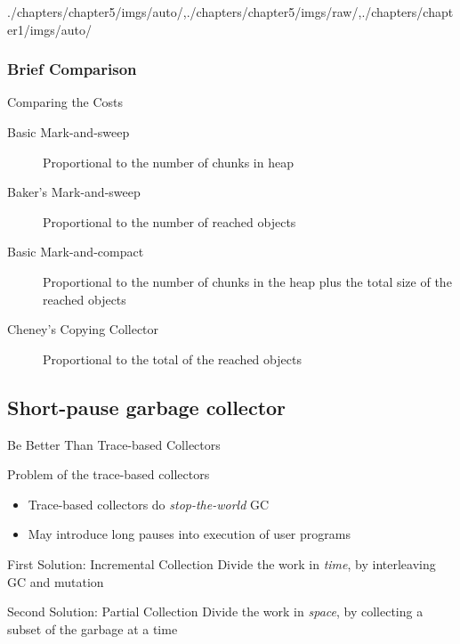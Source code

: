\begin{graphicspathcontext}{{./chapters/chapter5/imgs/auto/},{./chapters/chapter5/imgs/raw/},{./chapters/chapter1/imgs/auto/}}
\begin{bibunit}[apalike]
\subsubsection{Brief Comparison}
\subsubsectiontableofcontentslide

\begin{frame}[background=8]{Comparing the Costs}
	\begin{description}
		\item[Basic Mark-and-sweep] Proportional to the number of chunks in heap
		\vfill
		\item[Baker's Mark-and-sweep] Proportional to the number of reached objects
		\vfill
		\item[Basic Mark-and-compact] Proportional to the number of chunks in the heap plus the total size of the reached objects
		\vfill
		\item[Cheney's Copying Collector] Proportional to the total of the reached objects
	\end{description}
\end{frame}

\subsection{Short-pause garbage collector}
\subsectiontableofcontentslide

\begin{frame}{{Be Better Than} Trace-based Collectors}
	\begin{alertblock}{Problem of the trace-based collectors}
		\begin{itemize}
			\item Trace-based collectors do \emph{stop-the-world} GC
			\item May introduce long pauses into execution of user programs
		\end{itemize}
	\end{alertblock}
	\vspace{.5cm}
	\begin{block}{First Solution: Incremental Collection}
		Divide the work in \emph{time}, by interleaving GC and mutation
	\end{block}
	\vspace{.5cm}
	\begin{block}{Second Solution: Partial Collection}
		Divide the work in \emph{space}, by collecting a subset of the garbage at a time
	\end{block}
\end{frame}


\end{bibunit}
\end{graphicspathcontext}
